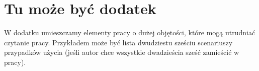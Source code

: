 \chapter{Tu może być dodatek}\label{Dod1}

W dodatku umieszczamy elementy pracy o dużej objętości, które mogą utrudniać czytanie pracy. Przykładem może być lista dwudziestu sześciu scenariuszy przypadków użycia (jeśli autor chce wszystkie dwadzieścia sześć zamieścić w pracy). \lipsum[9-11]